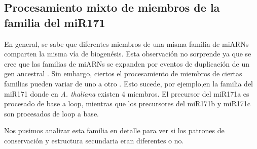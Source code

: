 \subsection{Procesamiento mixto de miembros de la familia del miR171}

En general, se sabe que diferentes miembros de una misma familia de miARNs comparten la misma vía de biogenésis. 
Esta observación no sorprende ya que se cree que las familias de miARNs se expanden por eventos de duplicación de un gen ancestral \citep{pmid15565108}.
Sin embargo, ciertos el procesamiento de miembros de ciertas familias pueden variar de uno a otro \citep{Bologna2013}.
Esto sucede, por ejemplo,en la familia del miR171 donde en \textit{A. thaliana} existen 4 miembros. 
El precursor del miR171a es procesado de base a loop, mientras que los precursores del miR171b y miR171c son procesados de loop a base.

Nos pusimos analizar esta familia en detalle para ver si los patrones de conservación y estructura secundaria eran diferentes o no.



